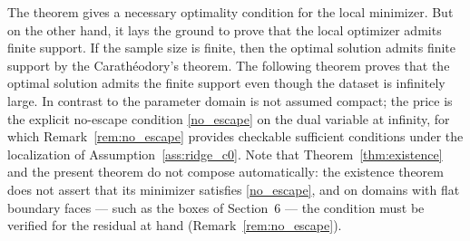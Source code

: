 \documentclass[11pt]{amsart}
\theoremstyle{definition}
\theoremstyle{remark}
\begin{document}
The theorem gives a necessary optimality condition for the local minimizer. 
But on the other hand, it lays the ground to prove that the local optimizer admits finite support. 
If the sample size is finite, then the optimal solution admits finite support by the Carath\'eodory's theorem. 
The following theorem proves that the optimal solution admits the finite support even though the dataset is infinitely large. 
In contrast to \cite{pieper2022nonconvex} the parameter domain is not assumed
compact; the price is the explicit no-escape condition \eqref{no_escape} on the
dual variable at infinity, for which Remark~\ref{rem:no_escape} provides
checkable sufficient conditions under the localization of
Assumption~\ref{ass:ridge_c0}.
Note that Theorem~\ref{thm:existence} and the present theorem do not compose
automatically: the existence theorem does not assert that its minimizer
satisfies \eqref{no_escape}, and on domains with flat boundary faces --- such
as the boxes of Section~6 --- the condition must be verified for the residual
at hand (Remark~\ref{rem:no_escape}).
\end{document}
